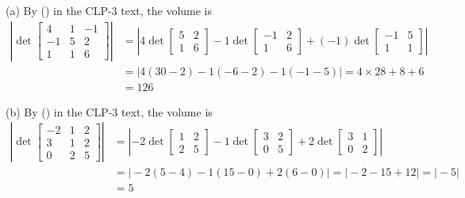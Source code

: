 \begin{solution}
(a) 
By () in the CLP-3 text, the volume is 
\begin{align*}
\left| \det\left[\begin{matrix}
          4&1&-1 \\
         -1&5&2 \\
          1&1&6\end{matrix}\right] \right|
&=\left| 4\det\left[\begin{matrix}
          5&2 \\
          1&6 \end{matrix}\right]
        -1\det\left[\begin{matrix}
         -1&2 \\ 
          1&6 \end{matrix}\right]
        +(-1)\det\left[\begin{matrix}
         -1&5\\1&1\end{matrix}\right]\right| \\
&= \big|4(30-2)-1(-6-2)-1(-1-5)\big| = 4\times28+8+6\\
&=126
\end{align*}

(b)
By () in the CLP-3 text, the volume is 
\begin{align*}
\left|\det\left[\begin{matrix}
       -2&1&2\\
       3&1&2\\
       0&2&5\end{matrix}\right] \right|
&=\left|-2\det\left[\begin{matrix}
          1&2\\
          2&5\end{matrix}\right]
        -1\det\left[\begin{matrix}
          3&2\\
          0&5\end{matrix}\right]
       +2\det\left[\begin{matrix}
         3&1\\
         0&2\end{matrix}\right] \right|\\
&=\big|-2(5-4)-1(15-0)+2(6-0)\big| =\big|-2-15+12\big|=\big|-5\big|\\
&=5
\end{align*}
\end{solution}

